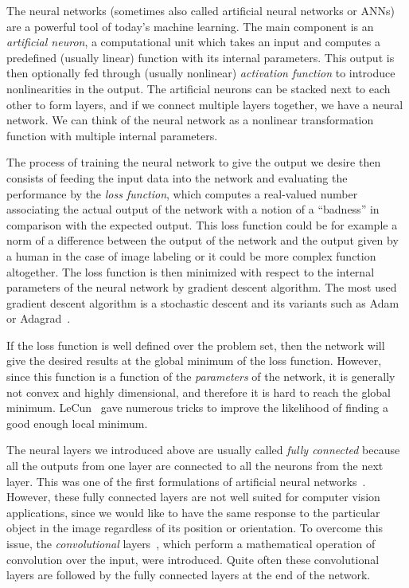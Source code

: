 The neural networks (sometimes also called artificial neural networks or ANNs) are a powerful tool of today's machine learning. The main component is an {\em artificial neuron}, a computational unit which takes an input and computes a predefined (usually linear) function with its internal parameters. This output is then optionally fed through (usually nonlinear) {\em activation function} to introduce nonlinearities in the output. The artificial neurons can be stacked next to each other to form layers, and if we connect multiple layers together, we have a neural network. We can think of the neural network as a nonlinear transformation function with multiple internal parameters.

The process of training the neural network to give the output we desire then consists of feeding the input data into the network and evaluating the performance by the {\em loss function}, which computes a real-valued number associating the actual output of the network with a notion of a ``badness'' in comparison with the expected output. This loss function could be for example a norm of a difference between the output of the network and the output given by a human in the case of image labeling or it could be more complex function altogether. The loss function is then minimized with respect to the internal parameters of the neural network by gradient descent algorithm. The most used gradient descent algorithm is a stochastic descent and its variants such as Adam~\cite{adam} or Adagrad~\cite{adagrad}.

If the loss function is well defined over the problem set, then the network will give the desired results at the global minimum of the loss function. However, since this function is a function of the {\em parameters} of the network, it is generally not convex and highly dimensional, and therefore it is hard to reach the global minimum. LeCun~\cite{efbackprop} gave numerous tricks to improve the likelihood of finding a good enough local minimum.

The neural layers we introduced above are usually called {\em fully connected} because all the outputs from one layer are connected to all the neurons from the next layer. This was one of the first formulations of artificial neural networks~\cite{orignet}. However, these fully connected layers are not well suited for computer vision applications, since we would like to have the same response to the particular object in the image regardless of its position or orientation. To overcome this issue, the {\em convolutional} layers~\cite{convnet}, which perform a mathematical operation of convolution over the input, were introduced. Quite often these convolutional layers are followed by the fully connected layers at the end of the network.

